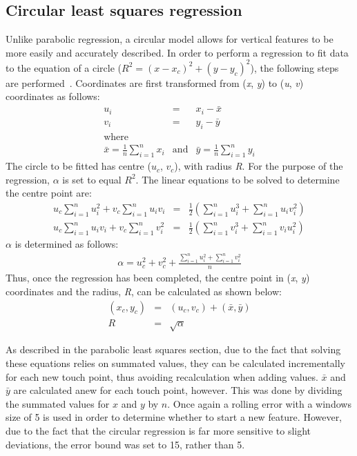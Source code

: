 \subsection{Circular least squares regression}
Unlike parabolic regression, a circular model allows for vertical features to be more easily and accurately described. In order to perform a regression to fit data to the equation of a circle ($R^2 = (x - x_c)^2 + (y - y_c)^2$), the following steps are performed~\citep{Bull06}. Coordinates are first transformed from (\emph{x}, \emph{y}) to (\emph{u}, \emph{v}) coordinates as follows:
\begin{eqnarray*}
	u_i & = & x_i - \bar{x} \\
	v_i & = & y_i - \bar{y} \\
	\mbox{where} \\
	\bar{x} = \frac{1}{n} \sum_{i=1}^n x_i & \mbox{and} & \bar{y} = \frac{1}{n} \sum_{i=1}^n y_i
\end{eqnarray*}
The circle to be fitted has centre ($u_c$, $v_c$), with radius \emph{R}. For the purpose of the regression, $\alpha$ is set to equal $R^2$. The linear equations to be solved to determine the centre point are:
\begin{eqnarray*}
	u_c \sum_{i=1}^n u_i^2 + v_c \sum_{i=1}^n u_i v_i & = & \frac{1}{2}\left(\sum_{i=1}^n u_i^3 + \sum_{i=1}^n u_i v_i^2 \right)  \\
	u_c \sum_{i=1}^n u_i v_i + v_c \sum_{i=1}^n v_i^2 & = & \frac{1}{2}\left(\sum_{i=1}^n v_i^3 + \sum_{i=1}^n v_i u_i^2 \right)	
\end{eqnarray*}
$\alpha$ is determined as follows:
\begin{eqnarray*}
	\alpha = u_c^2 + v_c^2 + \frac{\sum\limits^{n}_{i=1} u_i^2 + \sum\limits^{n}_{i=1} v_i^2}{n}	
\end{eqnarray*}
Thus, once the regression has been completed, the centre point in (\emph{x}, \emph{y}) coordinates and the radius, \emph{R}, can be calculated as shown below:
\begin{eqnarray*}
		(x_c, y_c) & = & (u_c, v_c) + (\bar{x}, \bar{y}) \\
		R & = & \sqrt{\alpha}
\end{eqnarray*}

As described in the parabolic least squares section, due to the fact that solving these equations relies on summated values, they can be calculated incrementally for each new touch point, thus avoiding recalculation when adding values. $\bar{x}$ and $\bar{y}$ are calculated anew for each touch point, however. This was done by dividing the summated values for $x$ and $y$ by $n$. Once again a rolling error with a windows size of 5 is used in order to determine whether to start a new feature. However, due to the fact that the circular regression is far more sensitive to slight deviations, the error bound was set to 15, rather than 5.

